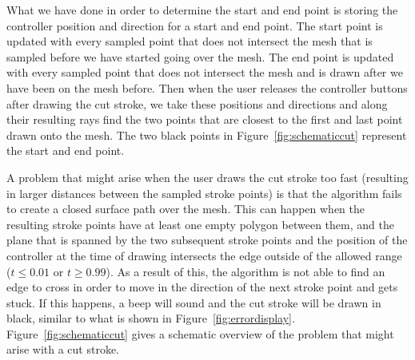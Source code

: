 What we have done in order to determine the start and end point is storing the controller position and direction for a start and end point. The start point is updated with every sampled point that does not intersect the mesh that is sampled before we have started going over the mesh. The end point is updated with every sampled point that does not intersect the mesh and is drawn after we have been on the mesh before. Then when the user releases the controller buttons after drawing the cut stroke, we take these positions and directions and along their resulting rays find the two points that are closest to the first and last point drawn onto the mesh. The two black points in Figure~\ref{fig:schematiccut} represent the start and end point. 

A problem that might arise when the user draws the cut stroke too fast (resulting in larger distances between the sampled stroke points) is that the algorithm fails to create a closed surface path over the mesh. This can happen when the resulting stroke points have at least one empty polygon between them, and the plane that is spanned by the two subsequent stroke points and the position of the controller at the time of drawing intersects the edge outside of the allowed range ($t \leq 0.01$ or $t \geq 0.99$). As a result of this, the algorithm is not able to find an edge to cross in order to move in the direction of the next stroke point and gets stuck. If this happens, a beep will sound and the cut stroke will be drawn in black, similar to what is shown in Figure~\ref{fig:errordisplay}. Figure~\ref{fig:schematiccut} gives a schematic overview of the problem that might arise with a cut stroke.

